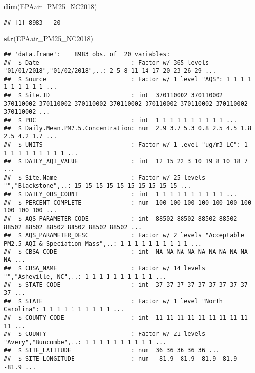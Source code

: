 \documentclass[]{article}
\newenvironment{Shaded}{\begin{snugshade}}{\end{snugshade}}
\newcommand{\KeywordTok}[1]{\textcolor[rgb]{0.13,0.29,0.53}{\textbf{#1}}}
\newcommand{\NormalTok}[1]{#1}
\begin{document}
\begin{Shaded}
\begin{Highlighting}[]
\KeywordTok{dim}\NormalTok{(EPAair_PM25_NC2018)}
\end{Highlighting}
\end{Shaded}

\begin{verbatim}
## [1] 8983   20
\end{verbatim}

\begin{Shaded}
\begin{Highlighting}[]
\KeywordTok{str}\NormalTok{(EPAair_PM25_NC2018)}
\end{Highlighting}
\end{Shaded}

\begin{verbatim}
## 'data.frame':    8983 obs. of  20 variables:
##  $ Date                          : Factor w/ 365 levels "01/01/2018","01/02/2018",..: 2 5 8 11 14 17 20 23 26 29 ...
##  $ Source                        : Factor w/ 1 level "AQS": 1 1 1 1 1 1 1 1 1 1 ...
##  $ Site.ID                       : int  370110002 370110002 370110002 370110002 370110002 370110002 370110002 370110002 370110002 370110002 ...
##  $ POC                           : int  1 1 1 1 1 1 1 1 1 1 ...
##  $ Daily.Mean.PM2.5.Concentration: num  2.9 3.7 5.3 0.8 2.5 4.5 1.8 2.5 4.2 1.7 ...
##  $ UNITS                         : Factor w/ 1 level "ug/m3 LC": 1 1 1 1 1 1 1 1 1 1 ...
##  $ DAILY_AQI_VALUE               : int  12 15 22 3 10 19 8 10 18 7 ...
##  $ Site.Name                     : Factor w/ 25 levels "","Blackstone",..: 15 15 15 15 15 15 15 15 15 15 ...
##  $ DAILY_OBS_COUNT               : int  1 1 1 1 1 1 1 1 1 1 ...
##  $ PERCENT_COMPLETE              : num  100 100 100 100 100 100 100 100 100 100 ...
##  $ AQS_PARAMETER_CODE            : int  88502 88502 88502 88502 88502 88502 88502 88502 88502 88502 ...
##  $ AQS_PARAMETER_DESC            : Factor w/ 2 levels "Acceptable PM2.5 AQI & Speciation Mass",..: 1 1 1 1 1 1 1 1 1 1 ...
##  $ CBSA_CODE                     : int  NA NA NA NA NA NA NA NA NA NA ...
##  $ CBSA_NAME                     : Factor w/ 14 levels "","Asheville, NC",..: 1 1 1 1 1 1 1 1 1 1 ...
##  $ STATE_CODE                    : int  37 37 37 37 37 37 37 37 37 37 ...
##  $ STATE                         : Factor w/ 1 level "North Carolina": 1 1 1 1 1 1 1 1 1 1 ...
##  $ COUNTY_CODE                   : int  11 11 11 11 11 11 11 11 11 11 ...
##  $ COUNTY                        : Factor w/ 21 levels "Avery","Buncombe",..: 1 1 1 1 1 1 1 1 1 1 ...
##  $ SITE_LATITUDE                 : num  36 36 36 36 36 ...
##  $ SITE_LONGITUDE                : num  -81.9 -81.9 -81.9 -81.9 -81.9 ...
\end{verbatim}
\end{document}

